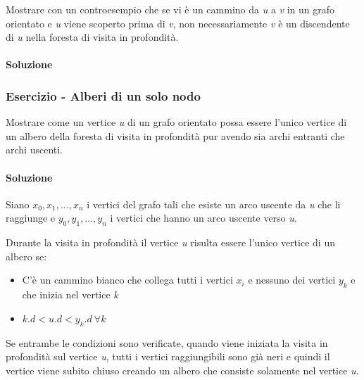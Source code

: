 Mostrare con un controesempio che se vi è un cammino da \textit{u} a \textit{v} in un grafo orientato e \textit{u} viene scoperto prima di \textit{v}, non necessariamente \textit{v} è un discendente di \textit{u} nella foresta di visita in profondità.

\paragraph{Soluzione}



\subsubsection{Esercizio - Alberi di un solo nodo}

Mostrare come un vertice \textit{u} di un grafo orientato possa essere l'unico vertice di un albero della foresta di visita in profondità pur avendo sia archi entranti che archi uscenti.

\paragraph{Soluzione} Siano $ x_0, x_1, \ldots, x_n $ i vertici del grafo tali che esiste un arco uscente da \textit{u} che li raggiunge e $ y_0, y_1, \ldots, y_n $ i vertici che hanno un arco uscente verso \textit{u}.

Durante la visita in profondità il vertice \textit{u} risulta essere l'unico vertice di un albero se:

\begin{itemize}
	\item C'è un cammino bianco che collega tutti i vertici $ x_i $ e nessuno dei vertici $ y_k $ e che inizia nel vertice \textit{k}
	\item $ k.d < u.d < y_k.d \: \forall k$
\end{itemize}

Se entrambe le condizioni sono verificate, quando viene iniziata la visita in profondità sul vertice \textit{u}, tutti i vertici raggiungibili sono già neri e quindi il vertice viene subito chiuso creando un albero che consiste solamente nel vertice \textit{u}.
